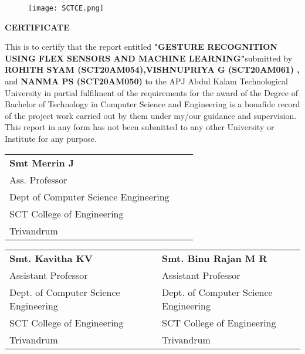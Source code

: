 \documentclass[a4paper,12pt,oneside]{report}
\begin{document}
 \begin{figure}[hbt]
\centering
\centerline{\texttt{[image: SCTCE.png]}}
\end{figure}

         \begin{center} \textbf{{\large \bf {CERTIFICATE}}}\vspace{0.1cm}\end{center}
	
 
 This is to certify that the report entitled {\textbf {"GESTURE RECOGNITION USING FLEX SENSORS AND MACHINE LEARNING"}}submitted by
{\textbf{ROHITH SYAM (SCT20AM054),VISHNUPRIYA G (SCT20AM061) , }} and {\textbf{NANMA PS (SCT20AM050)}}
to the APJ Abdul Kalam Technological University in partial fulfilment
of the requirements for the award of the Degree of Bachelor of Technology in Computer
Science and Engineering is a bonafide record of the project work carried out by them under
my/our guidance and supervision. This report in any form has not been submitted to any other
University or Institute for any purpose.
	
 \begin{singlespace}
  
  
  \vspace*{.65cm}
  
  \begin{center}
   \begin{tabular}{ p{6cm} p{.5cm} p{7cm} } 
    \textbf{Smt Merrin J} \\
    Ass. Professor \\ 
    Dept of Computer Science Engineering \\ 
    SCT College of Engineering \\
    Trivandrum && \\
   \end{tabular}
  \end{center}
  \vspace*{.65cm}
  
  \begin{center}
   \begin{tabular}{ p{6cm} p{0.5cm} p{7cm} } 
    \textbf{Smt. Kavitha KV} && \textbf{Smt. Binu Rajan M R } \\ 
    Assistant Professor  & & Assistant  Professor  \\ 
    Dept. of Computer Science Engineering && Dept. of Computer Science Engineering \\ 
    SCT College of Engineering & & SCT College of Engineering\\
    Trivandrum && Trivandrum\\
   \end{tabular}
  \end{center}
 \end{singlespace}
	
\end{document}
